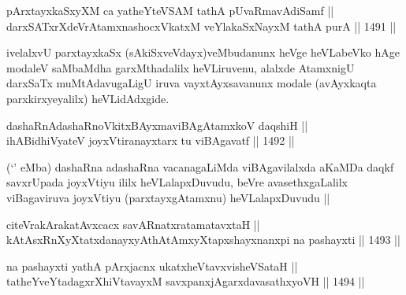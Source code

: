 \begin{shl}
pArxtayxkaSxyXM ca yatheYteVSAM tathA pUvaRmavAdiSamf ||  \\
darxSATxrXdeVrAtamxnashocxVkatxM veYlakaSxNayxM tathA purA ||  1491 ||  
\end{shl}

\begin{artha}
ivelalxvU parxtayxkaSx (sAkiSxveVdayx)veMbudanunx heVge heVLabeVko hAge modaleV saMbaMdha garxMthadalilx heVLiruvenu, alalxde AtamxnigU darxSaTx muMtAdavugaLigU iruva vayxtAyxsavanunx modale (avAyxkaqta parxkirxyeyalilx) heVLidAdxgide.
\end{artha}


\begin{shl}
dashaRnAdashaRnoVkitxBAyxmaviBAgAtamxkoV daqshiH || \\
ihABidhiVyateV joyxVtiranayxtarx tu viBAgavatf ||  1492 ||  
\end{shl}

\begin{artha}
(`\stext' eMba) dashaRna adashaRna vacanagaLiMda viBAgavilalxda aKaMDa daqkf savxrUpada joyxVtiyu ililx heVLalapxDuvudu, beVre avasethxgaLalilx viBagaviruva joyxVtiyu (parxtayxgAtamxnu) heVLalapxDuvudu ||
\end{artha}


\begin{shl}
citeVrakArakatAvxcacx savARnatxratamatavxtaH || \\
kAtAsxRnXyXtatxdanayxyAthAtAmxyXtapxshayxnanxpi na pashayxti ||  1493 ||  
\end{shl}
				
\begin{shl}
na pashayxti yathA pArxjacnx ukatxheVtavxvisheVSataH || \\
tatheYveYtadagxrXhiVtavayxM savxpanxjAgarxdavasathxyoVH ||  1494 ||  
\end{shl}

